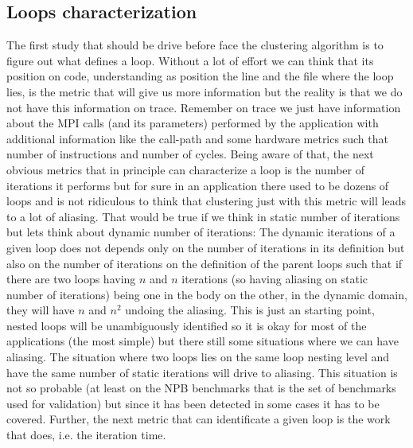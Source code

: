 \subsection{Loops characterization}

The first study that should be drive before face the clustering algorithm is to
figure out what defines a loop. Without a lot of effort we can think that its
position on code, understanding as position the line and the file where the loop
lies, is the metric that will give us more information but the reality is that 
we do not have this information on trace. Remember on trace we just have 
information about the MPI calls (and its parameters) performed by the application 
with additional information like the call-path and some hardware metrics such 
that number of instructions and number of cycles. Being aware of that, the next
obvious metrics that in principle can characterize a loop is the number of
iterations it performs but for sure in an application there used to be dozens of
loops and is not ridiculous to think that clustering just with this metric will
leads to a lot of aliasing. That would be true if we think in static number of
iterations but lets think about dynamic number of iterations: The dynamic
iterations of a given loop does not depends only on the number of iterations in
its definition but also on the number of iterations on the definition of the
parent loops such that if there are two loops having $n$ and $n$ iterations (so
having aliasing on static number of iterations) being one in the body on the
other, in the dynamic domain, they will have $n$ and $n^2$ undoing the aliasing.
This is just an starting point, nested loops will be unambiguously identified so
it is okay for most of the applications (the most simple) but there still some
situations where we can have aliasing. The situation where two loops
lies on the same loop nesting level and have the same number of static
iterations will drive to aliasing. This situation is not so probable (at least
on the NPB benchmarks that is the set of benchmarks used for validation) but
since it has been detected in some cases it has to be covered. Further, the next
metric that can identificate a given loop is the work that does, i.e. the
iteration time. 


